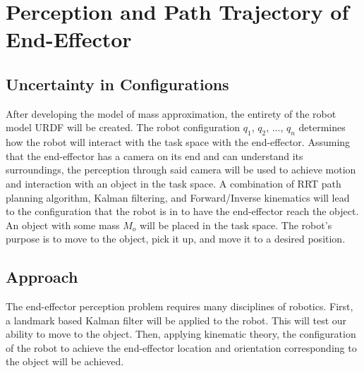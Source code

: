 \section{Perception and Path Trajectory of End-Effector}
\subsection{Uncertainty in Configurations}
After developing the model of mass approximation, the entirety of the robot model URDF will be created. The robot configuration $q_1$, $q_2$, ..., $q_n$ determines how the robot will interact with the task space with the end-effector.  Assuming that the end-effector has a camera on its end and can understand its surroundings, the perception through said camera will be used to achieve motion and interaction with an object in the task space.  A combination of RRT path planning algorithm, Kalman filtering, and Forward/Inverse kinematics will lead to the configuration that the robot is in to have the end-effector reach the object.  An object with some mass $M_o$ will be placed in the task space.  The robot's purpose is to move to the object, pick it up, and move it to a desired position.

\subsection{Approach}
The end-effector perception problem requires many disciplines of robotics.  First, a landmark based Kalman filter will be applied to the robot.  This will test our ability to move to the object.  Then, applying kinematic theory, the configuration of the robot to achieve the end-effector location and orientation corresponding to the object will be achieved.